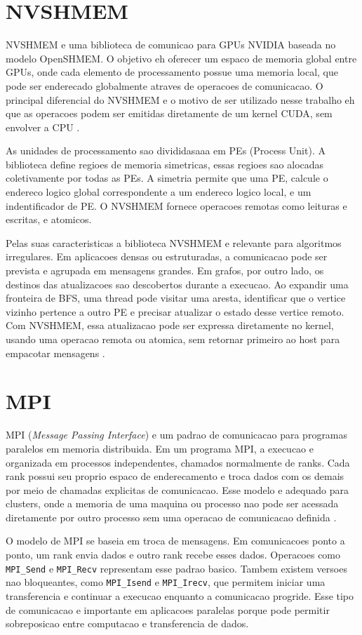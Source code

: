 \documentclass{article}
\begin{document}
\section{NVSHMEM}
NVSHMEM e uma biblioteca de comunicao para GPUs NVIDIA baseada no modelo OpenSHMEM. 
O objetivo eh oferecer um espaco de memoria global entre GPUs, onde cada elemento de 
processamento possue uma memoria local, que pode ser enderecado globalmente atraves de
operacoes de comunicacao. O principal diferencial do NVSHMEM e o motivo de ser utilizado
nesse trabalho eh que as operacoes podem ser emitidas diretamente de um kernel CUDA,
sem envolver a CPU \cite{hsunvshmem}.

As unidades de processamento sao divididasaaa em PEs (Process Unit). A biblioteca define
regioes de memoria simetricas, essas regioes sao alocadas coletivamente por todas as PEs.
A simetria permite que uma PE, calcule o endereco logico global correspondente a um
endereco logico local, e um indentificador de PE. O NVSHMEM fornece operacoes remotas
como leituras e escritas, e atomicos.

Pelas suas caracteristicas a biblioteca NVSHMEM e relevante para algoritmos irregulares.
Em aplicacoes densas ou estruturadas, a comunicacao pode ser prevista e agrupada
em mensagens grandes. Em grafos, por outro lado, os destinos das atualizacoes
sao descobertos durante a execucao. Ao expandir uma fronteira de BFS, uma thread
pode visitar uma aresta, identificar que o vertice vizinho pertence a outro PE e
precisar atualizar o estado desse vertice remoto. Com NVSHMEM, essa atualizacao
pode ser expressa diretamente no kernel, usando uma operacao remota ou atomica,
sem retornar primeiro ao host para empacotar mensagens \cite{hsunvshmem}.

\section{MPI}
MPI (\textit{Message Passing Interface}) e um padrao de comunicacao para
programas paralelos em memoria distribuida. Em um programa MPI, a execucao e
organizada em processos independentes, chamados normalmente de ranks. Cada rank
possui seu proprio espaco de enderecamento e troca dados com os demais por meio
de chamadas explicitas de comunicacao. Esse modelo e adequado para clusters,
onde a memoria de uma maquina ou processo nao pode ser acessada diretamente por
outro processo sem uma operacao de comunicacao definida \cite{mpistandard}.

O modelo de MPI se baseia em troca de mensagens. Em comunicacoes ponto a ponto,
um rank envia dados e outro rank recebe esses dados. Operacoes como
\texttt{MPI\_Send} e \texttt{MPI\_Recv} representam esse padrao basico. Tambem
existem versoes nao bloqueantes, como \texttt{MPI\_Isend} e
\texttt{MPI\_Irecv}, que permitem iniciar uma transferencia e continuar a
execucao enquanto a comunicacao progride. Esse tipo de comunicacao e importante
em aplicacoes paralelas porque pode permitir sobreposicao entre computacao e
transferencia de dados.
\end{document}
